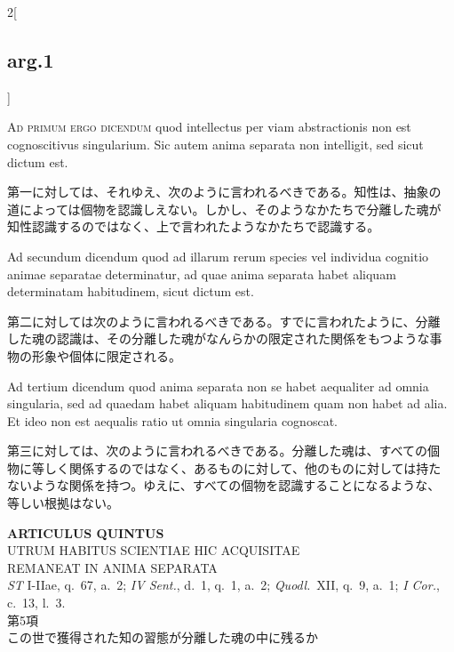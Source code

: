 \documentclass[paper=a4paper,fontsize=10pt,jafontsize=9pt,titlepage]{jlreq}
\begin{document}
\begin{paracol}{2}[\subsection{arg.1}]
\switchcolumn*[\subsection{ad.1}]

{\scshape Ad primum ergo dicendum} quod intellectus per viam abstractionis
non est cognoscitivus singularium. Sic autem anima separata non
intelligit, sed sicut dictum est.

\switchcolumn

第一に対しては、それゆえ、次のように言われるべきである。知性は、抽象の
道によっては個物を認識しえない。しかし、そのようなかたちで分離した魂が
知性認識するのではなく、上で言われたようなかたちで認識する。

\switchcolumn*

Ad secundum dicendum quod ad illarum rerum species vel individua
cognitio animae separatae determinatur, ad quae anima separata habet
aliquam determinatam habitudinem, sicut dictum est.

\switchcolumn

第二に対しては次のように言われるべきである。すでに言われたように、分離
した魂の認識は、その分離した魂がなんらかの限定された関係をもつような事
物の形象や個体に限定される。

\switchcolumn*

Ad tertium dicendum quod anima separata non se habet aequaliter ad
omnia singularia, sed ad quaedam habet aliquam habitudinem quam non
habet ad alia. Et ideo non est aequalis ratio ut omnia singularia
cognoscat.

\switchcolumn

第三に対しては、次のように言われるべきである。分離した魂は、すべての個
物に等しく関係するのではなく、あるものに対して、他のものに対しては持た
ないような関係を持つ。ゆえに、すべての個物を認識することになるような、
等しい根拠はない。

\end{paracol}

\newpage
{}

{}
\setcounter{section}{5}
\setcounter{subsection}{0}
\begin{center}
{\Large {\bfseries ARTICULUS QUINTUS}}\\ {\large UTRUM HABITUS SCIENTIAE HIC
ACQUISITAE\\ REMANEAT IN ANIMA SEPARATA}\\ {\footnotesize {\itshape ST}
I-IIae, q.~67, a.~2; {\itshape IV Sent.}, d.~1, q.~1, a.~2; {\itshape
Quodl.}~XII, q.~9, a.~1; {\itshape I Cor.}, c.~13, l.~3.}\\ {\Large 第5項\\
この世で獲得された知の習態が分離した魂の中に残るか}
\end{center}
\end{document}
